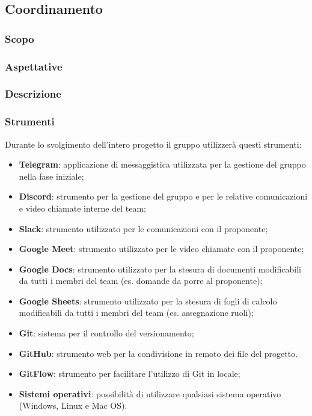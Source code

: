 \subsection{Coordinamento}

\subsubsection{Scopo}

\subsubsection{Aspettative}

\subsubsection{Descrizione}





\subsubsection{Strumenti}
Durante lo svolgimento dell'intero progetto il gruppo utilizzerà questi strumenti:
\begin{itemize}
	\item \textbf{Telegram}: applicazione di messaggistica utilizzata per la gestione del gruppo nella fase iniziale;
	\item \textbf{Discord}: strumento per la gestione del gruppo e per le relative comunicazioni e video chiamate interne del team;
	\item \textbf{Slack}: strumento utilizzato per le comunicazioni con il proponente;
	\item \textbf{Google Meet}: strumento utilizzato per le video chiamate con il proponente;
	\item \textbf{Google Docs}: strumento utilizzato per la stesura di documenti modificabili da tutti i membri del team (es. domande da porre al proponente);
	\item \textbf{Google Sheets}: strumento utilizzato per la stesura di fogli di calcolo modificabili da tutti i membri del team (es. assegnazione ruoli);
	\item \textbf{Git}: sistema per il controllo del versionamento;
	\item \textbf{GitHub}: strumento web per la condivisione in remoto dei file del progetto.
	\item \textbf{GitFlow}: strumento per facilitare l'utilizzo di Git in locale;
	\item \textbf{Sistemi operativi}: possibilità di utilizzare qualsiasi sistema operativo (Windows, Linux e Mac OS).
\end{itemize}